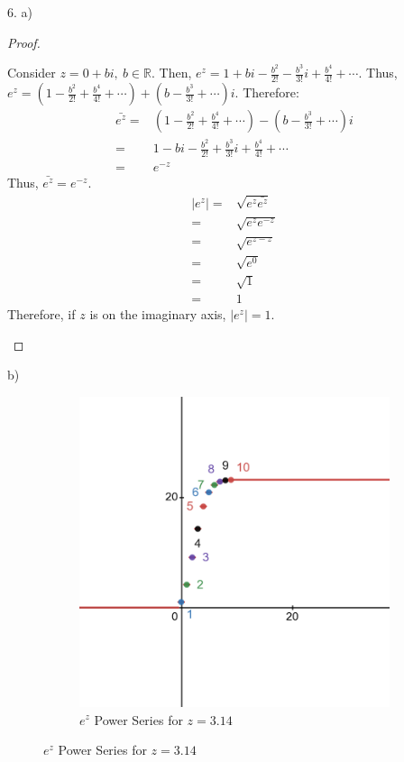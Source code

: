 \documentclass[11pt]{article}
\newcommand{\bproof}{\begin{proof}
$ $ \\
\begin{adjustwidth}{3em}{0pt}
}
\newcommand{\eproof}{\end{adjustwidth}
\end{proof}}
\begin{document}
\begin{flushleft}
\newpage

6. a)

\bproof

Consider $z = 0 + bi, \ b \in \mathbb{R}$. Then, $e^z = 1 + bi - \frac{b^2}{2!} - \frac{b^3}{3!}i + \frac{b^4}{4!} + \cdots$. Thus, $e^z = (1 - \frac{b^2}{2!} + \frac{b^4}{4!} + \cdots) + (b - \frac{b^3}{3!} + \cdots)i$. Therefore:
\begin{align*}
\bar{e^z} = & (1 - \frac{b^2}{2!} + \frac{b^4}{4!} + \cdots) - (b - \frac{b^3}{3!} + \cdots)i \\
= & 1 - bi - \frac{b^2}{2!} + \frac{b^3}{3!}i + \frac{b^4}{4!} + \cdots \\
= & e^{-z}
\end{align*}
Thus, $\bar{e^z} = e^{-z}$.
\begin{align*}
|e^z| = & \sqrt{e^z \bar{e^z}} \\
= & \sqrt{e^ze^{-z}} \\
= & \sqrt{e^{z-z}} \\
= & \sqrt{e^0} \\
= & \sqrt{1} \\
= & 1
\end{align*}
Therefore, if $z$ is on the imaginary axis, $|e^z| = 1$.

\eproof

b)

\begin{figure}[h]
\centering
	\begin{subfigure}[b]{0.4\textwidth}
	\includegraphics[width=\textwidth]{exponentialpowerseries.png}
	\caption{$e^z$ Power Series for $z = 3.14$}
	\end{subfigure}
\end{figure}

\end{flushleft}
\end{document}
